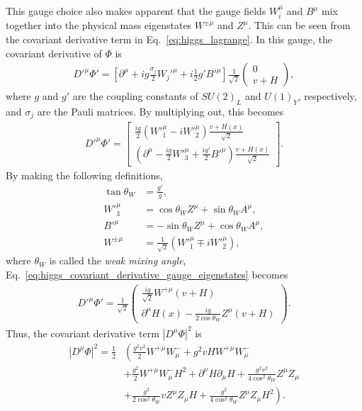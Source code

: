\documentclass[twoside,english]{uiofysmaster}
\begin{document}
This gauge choice also makes apparent that the gauge fields $W^\mu_i$ and $B^\mu$ mix together into the physical mass eigenstates $W^{\pm\mu}$ and $Z^\mu$. This can be seen from the covariant derivative term in Eq.\ \eqref{eq:higgs_lagrange}. In this gauge, the covariant derivative of $\Phi$ is
\begin{align}
	D'^\mu \Phi' = \left[ \partial^\mu + i g \frac{\sigma_j}{2} W_j'^\mu + i \frac{1}{2} g' B'^\mu \right]\frac{1}{\sqrt{2}}\begin{pmatrix}
		0 \\ v + H
	\end{pmatrix},
\end{align}
where $g$ and $g'$ are the coupling constants of $SU(2)_L$ and $U(1)_Y$, respectively, and $\sigma_j$ are the Pauli matrices. By multiplying out, this becomes
\begin{align}
	D'^\mu \Phi' = \begin{bmatrix}
		\frac{ig}{2}(W'^\mu_1 - iW'^\mu_2) \frac{v+H(x)}{\sqrt{2}} \\
		\left( \partial^\mu - \frac{ig}{2}W'^\mu_3 + \frac{ig'}{2} B'^\mu \right) \frac{v+H(x)}{\sqrt{2}}\nonumber \label{eq:higgs_covariant_derivative_gauge_eigenstates}
	\end{bmatrix}.
\end{align}
By making the following definitions,
\begin{align}
	\tan\theta_W &= \frac{g'}{g},\\
	{W'}^\mu_3 &= \cos\theta_W Z^\mu + \sin\theta_W A^\mu,\\
	{B'}^\mu &= -\sin\theta_W Z^\mu + \cos\theta_W A^\mu,\\
	W^{\pm \mu} &= \frac{1}{\sqrt{2}} \left({W'}_1^\mu \mp i{W'}_2^\mu \right),
\end{align}
where $\theta_W$ is called the {\it weak mixing angle}, Eq.\ \eqref{eq:higgs_covariant_derivative_gauge_eigenstates} becomes 
\begin{align}
	D'^\mu\Phi' = \frac{1}{\sqrt{2}} \begin{pmatrix}
		\frac{ig}{\sqrt{2}} W^{+\mu}\left(v+H\right) \\
		\partial^\mu H(x) - \frac{ig}{2\cos\theta_W}Z^\mu \left(v+H\right) 
	\end{pmatrix}.
\end{align}
Thus, the covariant derivative term $|D^\mu \Phi|^2$ is
\begin{align}
	|D^\mu \Phi|^2 = \frac{1}{2}&\left( \frac{g^2v^2}{2} W^{+\mu} W^-_\mu + g^2vHW^{+\mu}W^-_\mu \right.\nonumber\\
	&+ \frac{g^2}{2} W^{+\mu}W^-_\mu H^2 + \partial^\mu H \partial_\mu H + \frac{g^2v^2}{4\cos^2\theta_W} Z^\mu Z_\mu \\
	&+ \left. \frac{g^2}{2\cos^2\theta_W} v Z^\mu Z_\mu H + \frac{g^2}{4\cos^2\theta_W}Z^\mu Z_\mu H^2 \right).\nonumber
\end{align}
\end{document}
